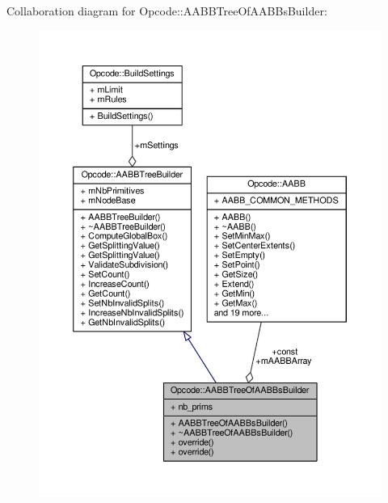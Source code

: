 Collaboration diagram for Opcode\+:\+:A\+A\+B\+B\+Tree\+Of\+A\+A\+B\+Bs\+Builder\+:
\nopagebreak
\begin{figure}[H]
\begin{center}
\leavevmode
\includegraphics[width=350pt]{d6/d3d/classOpcode_1_1AABBTreeOfAABBsBuilder__coll__graph}
\end{center}
\end{figure}
